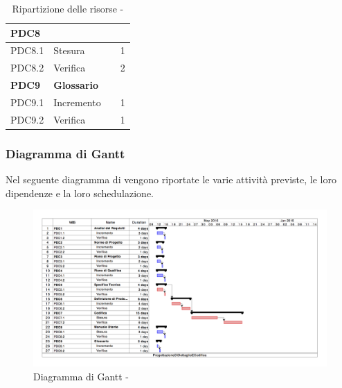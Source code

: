 \documentclass[12pt,a4paper]{article}
\begin{document}
\begin{table}[H]
\begin{center}
\begin{tabular}{p{} p{} p{} p{}}
			\textbf{PDC8} & \textbf{\MU{}} & & \\ \midrule
			PDC8.1 & Stesura & \AM{} \newline \PG{} & 1 \newline 5 \\ \midrule
			PDC8.2 & Verifica & \VR{} & 2 \\ \midrule
			\textbf{PDC9} & \textbf{Glossario} & & \\ \midrule
			PDC9.1 & Incremento & \VR{} & 1 \\ \midrule
			PDC9.2 & Verifica & \VR{} & 1 \\
			\bottomrule
		\end{tabular}
		\caption{Ripartizione delle risorse - \FPDC{}}
	\end{center}
\end{table}

\newpage
\subsubsection{Diagramma di Gantt}
Nel seguente diagramma di  vengono riportate le varie attività previste, le loro dipendenze e la loro schedulazione.

\begin{center}
	\begin{figure}[H]
		\centering
		\includegraphics[width=\textwidth]{../img/ganttProgettazioneDiDettaglioECodifica.png}
		\caption{Diagramma di Gantt - \FPDC{}}
	\end{figure}
\end{center}

\newpage
\end{document}
